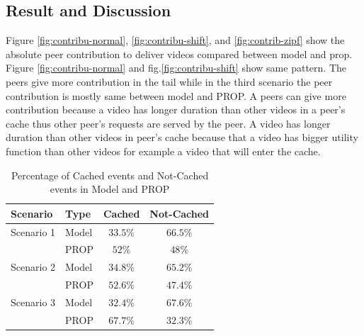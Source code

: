 \documentclass[10pt,final,journal,a4paper]{IEEEtran}
\begin{document}
\subsection{Result and Discussion}\label{resultanddiscussion}
Figure \ref{fig:contribu-normal}, \ref{fig:contribu-shift}, and \ref{fig:contrib-zipf} show the absolute peer contribution to deliver videos compared between model and prop. 
Figure \ref{fig:contribu-normal} and fig.\ref{fig:contribu-shift} show same pattern.
The peers give more contribution in the tail while in the third scenario the peer contribution is mostly same between model and PROP. 
A peers can give more contribution because a video has longer duration than other videos in a peer's cache thus other peer's requests are served by the peer. 
A video has longer duration than other videos in peer's cache because that a video has bigger utility function than other videos for example a video that will enter the cache. 

\begin{table}[!t]
\caption{Percentage of Cached events and Not-Cached events in Model and PROP}
\label{tab:stacked1}
\centering
\begin{tabular}{|l|l|c|c|}
\hline
Scenario & Type & Cached & Not-Cached\\
\hline
Scenario 1 & Model & $33.5\%$ & $66.5\%$ \\
\hline
 & PROP & $52\%$ & $48\%$  \\
\hline

Scenario 2 & Model & $34.8\%$ & $65.2\%$ \\
\hline
 & PROP & $52.6\%$ & $47.4\%$  \\
\hline

Scenario 3 & Model & $32.4\%$ & $67.6\%$  \\
\hline
 & PROP & $67.7\%$ & $32.3\%$ \\
\hline
\end{tabular}
\end{table}
\end{document}
